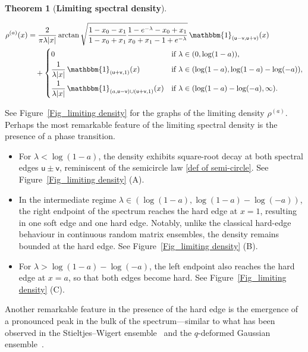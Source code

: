 \documentclass{amsart}
\theoremstyle{plain}
\newtheorem{thm}{Theorem}[section]
\theoremstyle{remark}
\newcommand{\abs}[1]{\lvert#1\rvert}
\numberwithin{equation}{section}
\begin{document}
\begin{thm}[\textbf{Limiting spectral density}]
\begin{itemize}
\begin{align}
    \begin{split}
    \rho^{(a)}(x) & = \frac{2}{\pi\lambda\abs{x} }\arctan{\sqrt{\frac{1-x_0-x_1}{1-x_0+x_1}\frac{1-e^{-\lambda}-x_0+x_1}{x_0+x_1-1+e^{-\lambda}}}}\, \mathbbm{1}_{(\mathsf{u}-\mathsf{v},\mathsf{u}+\mathsf{v} ) }( x )  
    \\
    & \quad + \begin{cases}
    0 &\textup{if } \lambda \in (0, \log(1-a) ) , 
    \smallskip 
    \\
    \displaystyle 
    \frac{1}{\lambda |x|} \, \mathbbm{1}_{(\mathsf{u}+\mathsf{v},1)} (x)
    &\textup{if }\lambda \in ( \log(1-a), \log(1-a)-\log(-a)) , 
    \smallskip 
    \\
   \displaystyle \frac{1}{\lambda |x|} \, \mathbbm{1}_{(a,\mathsf{u}-\mathsf{v}) \cup (\mathsf{u}+\mathsf{v},1) } (x) 
    &\textup{if }\lambda \in (\log(1-a)-\log(-a),\infty) . 
    \end{cases}
    \end{split}
    \end{align} 
\end{itemize} 
\end{thm}
 

 
See Figure~\ref{Fig_limiting density} for the graphs of the limiting density $\rho^{(a)}$. 
Perhaps the most remarkable feature of the limiting spectral density is the presence of a phase transition. 
\begin{itemize}
    \item For $\lambda < \log(1 - a)$, the density exhibits square-root decay at both spectral edges $\mathsf{u} \pm \mathsf{v}$, reminiscent of the semicircle law \eqref{def of semi-circle}. See Figure~\ref{Fig_limiting density} (A). 
    \smallskip 
    \item In the intermediate regime $\lambda \in (\log(1 - a), \log(1 - a) - \log(-a))$, the right endpoint of the spectrum reaches the hard edge at $x = 1$, resulting in one soft edge and one hard edge. Notably, unlike the classical hard-edge behaviour in continuous random matrix ensembles, the density remains bounded at the hard edge. See Figure~\ref{Fig_limiting density} (B).
    \smallskip 
    \item For $\lambda > \log(1 - a) - \log(-a)$, the left endpoint also reaches the hard edge at $x = a$, so that both edges become hard. See Figure~\ref{Fig_limiting density} (C).
\end{itemize}
Another remarkable feature in the presence of the hard edge is the emergence of a pronounced peak in the bulk of the spectrum—similar to what has been observed in the Stieltjes--Wigert ensemble~\cite{Fo21} and the $q$-deformed Gaussian ensemble~\cite{BFO24}.  
\end{document}

